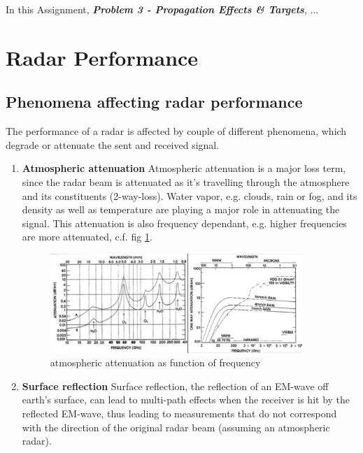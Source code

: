 

In this Assignment, \textit{\textbf{Problem 3 - Propagation Effects \& Targets}}, ...


\section{Radar Performance}

\subsection{Phenomena affecting radar performance}
\label{chap:diffraction}
The performance of a radar is affected by couple of different phenomena, which degrade or attenuate the sent and received signal.
\begin{enumerate}
	\item \textbf{Atmospheric attenuation} \newline
			Atmospheric attenuation is a major loss term, since the radar beam is attenuated as it's travelling through the atmosphere and its constituents (2-way-loss).
			Water vapor, e.g. clouds, rain or fog, and its density as well as temperature are playing a major role in attenuating the signal. This attenuation is also frequency dependant, e.g. higher frequencies are more attenuated, c.f. fig \ref{fig:attenuation}.
			\begin{figure}[!htbp]
			\centering
			\includegraphics[width=0.9\textwidth]{images/attenuation}
			\caption{atmospheric attenuation as function of frequency \citep{erickson:lecture}}
			\label{fig:attenuation}
			\end{figure}
	\item \textbf{Surface reflection} \newline
			Surface reflection, the reflection of an EM-wave off earth's surface, can lead to multi-path effects when the receiver is hit by the reflected EM-wave, thus leading to measurements that do not correspond with the direction of the original radar beam (assuming an atmospheric radar).

\end{enumerate}

